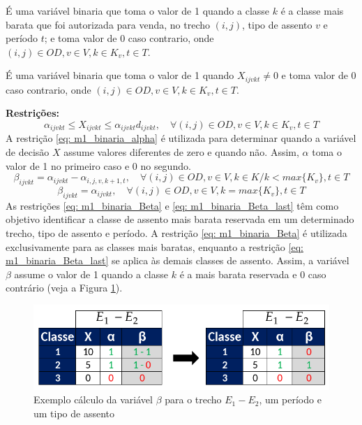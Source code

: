 \begin{description}[style=unboxed, leftmargin=2.5cm, labelindent=1.5cm]
	\setlength{\itemsep}{-2.2em} %
	\setlength{\parskip}{0em} %
	\item[$\beta_{ijvkt}:$] É uma variável binaria que toma o valor de 1 quando a classe $k$ é a classe mais barata que foi autorizada para venda, no trecho $(i,j)$, tipo de assento $v$ e período $t$; e toma  valor de 0 caso contrario, onde $(i,j) \in OD, v \in V, k \in K_v, t \in T$.  \\
	\item[$\alpha_{ijvkt}:$] É uma variável binaria que toma o valor de 1 quando $X_{ijvkt} \neq 0$ e toma  valor de 0 caso contrario, onde $(i,j) \in OD, v \in V, k \in K_v, t \in T$.
\end{description}
\textbf{Restrições:}
\begin{equation}
	\alpha_{ijvkt} \leq X_{ijvkt} \leq \alpha_{ijvkt}d_{ijvkt}, \quad   \forall(i,j) \in OD, v \in V, k \in K_v, t \in T   \label{eq: m1_binaria_alpha}
\end{equation}
A restrição  \eqref{eq: m1_binaria_alpha} é utilizada para determinar quando a variável de decisão $X$ assume valores diferentes de zero e quando não. Assim, $\alpha$ toma o valor de 1 no primeiro caso e 0 no segundo.
\begin{equation}
	\beta_{ijvkt} = \alpha_{ijvkt} - \alpha_{i,j,v,k+1,t}, \quad \forall (i,j) \in OD, v \in V, k \in K /k < max\{K_v\}, t\in T    \label{eq: m1_binaria_Beta}
\end{equation}
\begin{equation}
	\beta_{ijvkt} = \alpha_{ijvkt}, \quad   \forall(i,j) \in OD, v \in V, k = max\{K_v\}, t \in T    \label{eq: m1_binaria_Beta_last}
\end{equation}
As restrições \eqref{eq: m1_binaria_Beta} e \eqref{eq: m1_binaria_Beta_last} têm como objetivo identificar a classe de assento mais barata reservada em um determinado trecho, tipo de assento e período. A restrição \eqref{eq: m1_binaria_Beta} é utilizada exclusivamente para as classes mais baratas, enquanto a restrição \eqref{eq: m1_binaria_Beta_last} se aplica às demais classes de assento. Assim, a variável $\beta$ assume o valor de 1 quando a classe $k$ é a mais barata reservada e 0 caso contrário (veja a Figura \ref{fig: betha}).
\begin{figure}[H]
	\begin{center}
		\includegraphics[scale=0.45]{img/betha.png}
		\caption{Exemplo cálculo da variável $\beta$ para o trecho $E_1 - E_2$, um período e um tipo de assento}
		\label{fig: betha}
	\end{center}
\end{figure}

